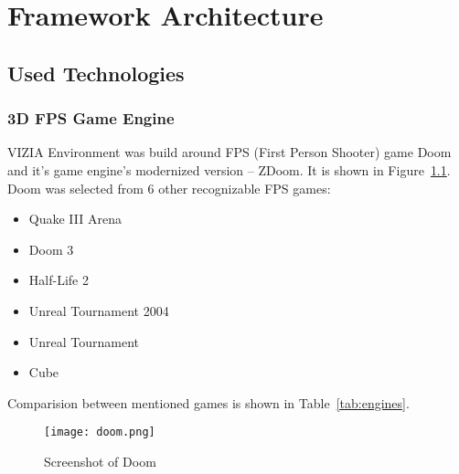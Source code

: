 
\chapter{Framework Architecture}
\label{ch:architecture}
\section{Used Technologies}
\label{sec:technologies}

\subsection{3D FPS Game Engine}


VIZIA Environment was build around FPS (First Person Shooter) game Doom and it's game engine's modernized version -- ZDoom. It is shown in Figure~\ref{fig:doom}. 
Doom was selected from 6 other recognizable FPS games: 

\begin{itemize}
\item Quake III Arena 
\item Doom 3
\item Half-Life 2 
\item Unreal Tournament 2004
\item Unreal Tournament
\item Cube
\end{itemize}
Comparision between mentioned games is shown in Table~\ref{tab:engines}.


\begin{figure}
\centering
\texttt{[image: doom.png]}
\caption{Screenshot of Doom}
\label{fig:doom}
\end{figure}
  




